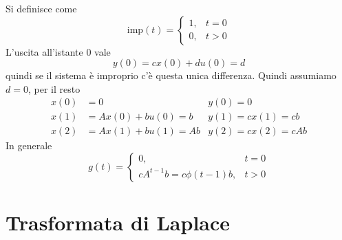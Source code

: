\documentclass[10pt,a4paper]{book}
\begin{document}
Si definisce come
\begin{equation*}
\mathrm{imp}(t) =\begin{cases}
1, & t=0\\
0, & t >0
\end{cases}
\end{equation*}
L'uscita all'istante $0$ vale
\begin{equation*}
y( 0) =cx( 0) +du( 0) =d
\end{equation*}
quindi se il sistema è improprio c'è questa unica differenza. Quindi assumiamo $d=0$, per il resto
\begin{equation*}
\begin{aligned}
x( 0) & =0 & y( 0) =0\\
x( 1) & =Ax( 0) +bu( 0) =b & y( 1) =cx( 1) =cb\\
x( 2) & =Ax( 1) +bu( 1) =Ab & y( 2) =cx( 2) =cAb
\end{aligned}
\end{equation*}
In generale
\begin{equation*}
\boxed{g(t) =\begin{cases}
0, & t=0\\
cA^{t-1} b=c\phi ( t-1) b, & t >0
\end{cases}}
\end{equation*}
\section{Trasformata di Laplace}
\end{document}
